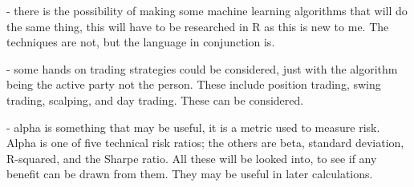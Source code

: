 \documentclass[conference]{IEEEtran}
\begin{document}
- there is the possibility of making some machine learning algorithms that will do the same thing, this will have to be researched in R as this is new to me. The techniques are not, but the language in conjunction is.

- some hands on trading strategies could be considered, just with the algorithm being the active party not the person. These include position trading, swing trading, scalping, and day trading. These can be considered.

- alpha is something that may be useful, it is a metric used to measure risk. Alpha is one of five technical risk ratios; the others are beta, standard deviation, R-squared, and the Sharpe ratio. All these will be looked into, to see if any benefit can be drawn from them. They may be useful in later calculations.
\fi
\end{document}
